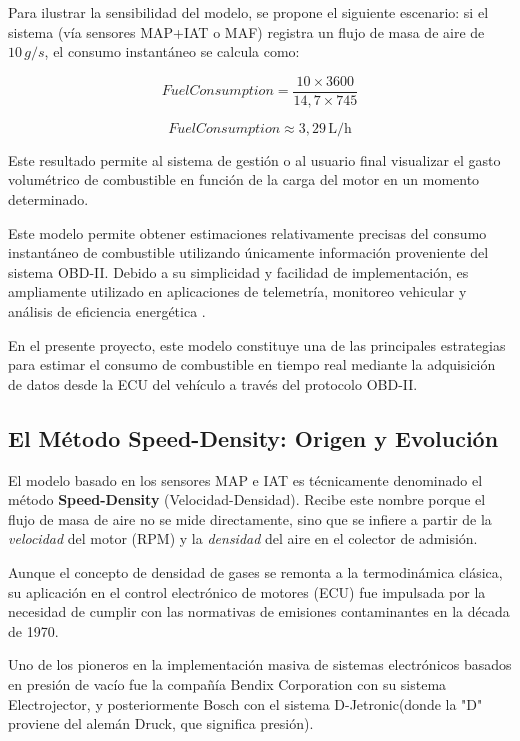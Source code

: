 Para ilustrar la sensibilidad del modelo, se propone el siguiente escenario: si el sistema (vía sensores MAP+IAT o MAF) registra un flujo de masa de aire de $10 \, g/s$, el consumo instantáneo se calcula como:

\begin{equation}
	FuelConsumption = \frac{10 \times 3600}{14{,}7 \times 745}
\end{equation}

\begin{equation}
	FuelConsumption \approx 3{,}29 \, \mathrm{L/h}
\end{equation}

Este resultado permite al sistema de gestión o al usuario final visualizar el gasto volumétrico de combustible en función de la carga del motor en un momento determinado.

Este modelo permite obtener estimaciones relativamente precisas del consumo instantáneo de combustible utilizando únicamente información proveniente del sistema OBD-II. Debido a su simplicidad y facilidad de implementación, es ampliamente utilizado en aplicaciones de telemetría, monitoreo vehicular y análisis de eficiencia energética \citep{CSSElectronics_OBD2, Hella_MAF}.

En el presente proyecto, este modelo constituye una de las principales estrategias para estimar el consumo de combustible en tiempo real mediante la adquisición de datos desde la ECU del vehículo a través del protocolo OBD-II.


\subsection{El Método Speed-Density: Origen y Evolución}

El modelo basado en los sensores MAP e IAT es técnicamente denominado el método \textbf{Speed-Density} (Velocidad-Densidad). Recibe este nombre porque el flujo de masa de aire no se mide directamente, sino que se infiere a partir de la \textit{velocidad} del motor (RPM) y la \textit{densidad} del aire en el colector de admisión.


Aunque el concepto de densidad de gases se remonta a la termodinámica clásica, su aplicación en el control electrónico de motores (ECU) fue impulsada por la necesidad de cumplir con las normativas de emisiones contaminantes en la década de 1970.

Uno de los pioneros en la implementación masiva de sistemas electrónicos basados en presión de vacío fue la compañía Bendix Corporation con su sistema Electrojector, y posteriormente Bosch con el sistema D-Jetronic(donde la "D" proviene del alemán Druck, que significa presión).

